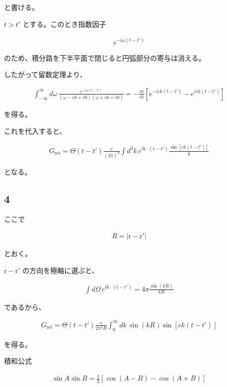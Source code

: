 \documentclass[platex,dvipdfmx,a4paper]{jsarticle}
\newcommand{\vect}[1]{\boldsymbol{\mathrm{#1}}}
\begin{document}
と書ける。

$t>t'$ とする。このとき指数因子

\begin{align*}
e^{-i\omega(t-t')}
\end{align*}

のため、積分路を下半平面で閉じると円弧部分の寄与は消える。

したがって留数定理より、

\begin{align*}
\int_{-\infty}^{\infty}
d\omega\,
\frac{
e^{-i\omega(t-t')}
}{
(\omega-ck+i0)
(\omega+ck+i0)
}
=
-\frac{\pi i}{ck}
\left[
e^{-ick(t-t')}
-
e^{ick(t-t')}
\right]
\end{align*}

を得る。

これを代入すると、

\begin{align*}
G_{\mathrm{ret}}
=
\Theta(t-t')
\frac{c}{(2\pi)^3}
\int d^3k\,
e^{i\vect k\cdot(\vect r-\vect r')}
\frac{\sin\!\left[ck(t-t')\right]}{k}
\end{align*}

となる。

\subsection*{4}

ここで

\begin{align*}
R=|\vect r-\vect r'|
\end{align*}

とおく。

$\vect r-\vect r'$ の方向を極軸に選ぶと、

\begin{align*}
\int d\Omega\,
e^{i\vect k\cdot(\vect r-\vect r')}
=
4\pi
\frac{\sin(kR)}{kR}
\end{align*}

であるから、

\begin{align*}
G_{\mathrm{ret}}
=
\Theta(t-t')
\frac{c}{2\pi^2R}
\int_0^\infty
dk\,
\sin(kR)
\sin\!\left[ck(t-t')\right]
\end{align*}

を得る。

積和公式

\begin{align*}
\sin A\sin B
=
\frac12
\left[
\cos(A-B)-\cos(A+B)
\right]
\end{align*}
\end{document}

